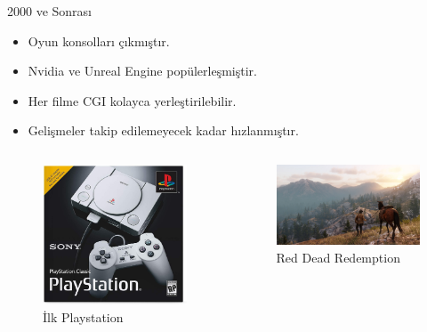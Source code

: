 \documentclass{beamer}
\begin{document}
\begin{frame}{2000 ve Sonrası}
\begin{itemize}
\item Oyun konsolları çıkmıştır.
\item Nvidia ve Unreal Engine popülerleşmiştir.
\item Her filme CGI kolayca yerleştirilebilir.
\item Gelişmeler takip edilemeyecek kadar hızlanmıştır.
\end{itemize}
\begin{columns}
\begin{column}{0.3\textwidth}
\begin{figure}
\includegraphics[width=\textwidth]{ps.jpg}
\caption{İlk Playstation}
\end{figure}
\end{column}
\begin{column}{0.5\textwidth}
\begin{figure}
\includegraphics[width=\textwidth]{rdr2.jpg}
\caption{Red Dead Redemption}
\end{figure}
\end{column}
\end{columns}
\end{frame}
\end{document}
